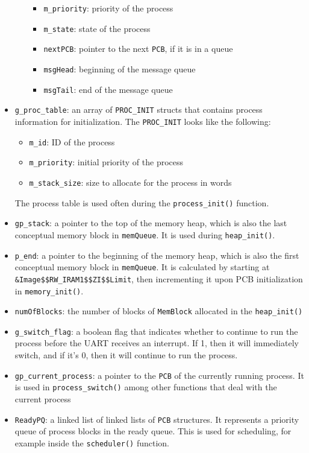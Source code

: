 \documentclass[12pt]{report}
\begin{document}
\begin{itemize}
\begin{itemize}
\begin{itemize}
          \item \texttt{m_priority}: priority of the process
          \item \texttt{m_state}: state of the process
          \item \texttt{nextPCB}: pointer to the next \texttt{PCB}, if it is in a queue
          \item \texttt{msgHead}: beginning of the message queue
          \item \texttt{msgTail}: end of the message queue
        \end{itemize}
    \end{itemize}
  \item \texttt{g_proc_table}: an array of \texttt{PROC_INIT} structs that contains process information for initialization. The \texttt{PROC_INIT} looks like the following:
    \begin{itemize}
      \item \texttt{m_id}: ID of the process
      \item \texttt{m_priority}: initial priority of the process
      \item \texttt{m_stack_size}: size to allocate for the process in words
    \end{itemize}
  The process table is used often during the \texttt{process_init()} function.
    \item \texttt{gp_stack}: a pointer to the top of the memory heap, which is also the last conceptual memory block in \texttt{memQueue}. It is used during \texttt{heap_init()}.
  \item \texttt{p_end}: a pointer to the beginning of the memory heap, which is also the first conceptual memory block in \texttt{memQueue}. It is calculated by starting at \texttt{\&Image\$\$RW_IRAM1\$\$ZI\$\$Limit}, then incrementing it upon PCB initialization in \texttt{memory_init()}.
  \item \texttt{numOfBlocks}: the number of blocks of \texttt{MemBlock} allocated in the \texttt{heap_init()}
  \item \texttt{g_switch_flag}: a boolean flag that indicates whether to continue to run the process before the UART receives an interrupt. If 1, then it will immediately switch, and if it's 0, then it will continue to run the process.
  \item \texttt{gp_current_process}: a pointer to the \texttt{PCB} of the currently running process. It is used in \texttt{process_switch()} among other functions that deal with the current process
  \item \texttt{ReadyPQ}: a linked list of linked lists of \texttt{PCB} structures. It represents a priority queue of process blocks in the ready queue. This is used for scheduling, for example inside the \texttt{scheduler()} function.

\end{itemize}
\end{document}
